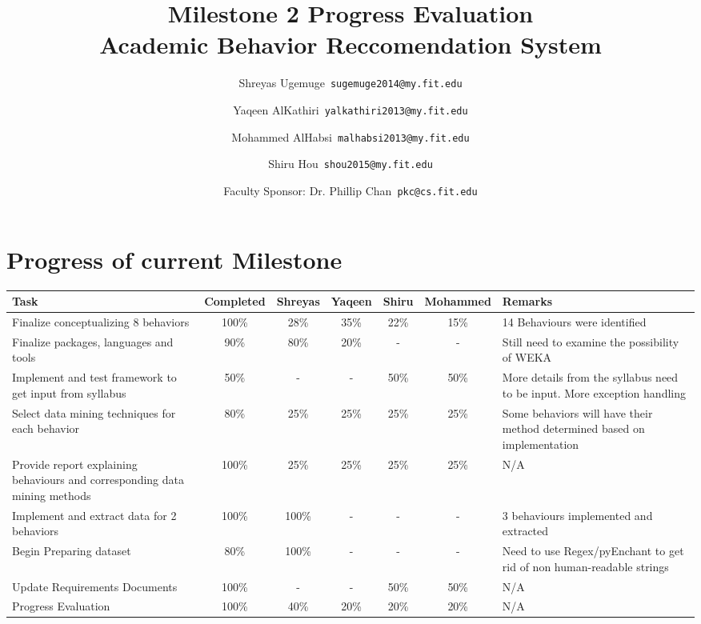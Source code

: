 \documentclass[12pt]{article}
\begin{document}
	\title{\textbf{Milestone 2 Progress Evaluation} \\ \hfill \break
	Academic Behavior Reccomendation System}
	\author{Shreyas Ugemuge\      \texttt{sugemuge2014@my.fit.edu}
  \and
  Yaqeen AlKathiri\      \texttt{yalkathiri2013@my.fit.edu}
  \and
	Mohammed AlHabsi\      \texttt{malhabsi2013@my.fit.edu}
  \and
  Shiru Hou\      \texttt{shou2015@my.fit.edu}
  \and
  Faculty Sponsor: Dr. Phillip Chan\      \texttt{pkc@cs.fit.edu}}
	\maketitle
	\pagebreak
	\singlespacing
	\tableofcontents
	\pagebreak
	\section{Progress of current Milestone}
	\begin{adjustbox}{totalheight=\baselineskip}
	\begin{tabularx}{\textwidth}{|X|c|c|c|c|c|X|}
	\hline
		\textbf{Task} & \textbf{Completed} &\textbf{Shreyas} & \textbf{Yaqeen} & \textbf{Shiru} & \textbf{Mohammed} & \textbf{Remarks}  \\
		\hline
		Finalize conceptualizing 8 behaviors & 100\% & 28\% & 35\% & 22\% & 15\% & 14 Behaviours were identified \\ \hline
		Finalize packages, languages and tools & 90\% & 80\% & 20\% & - & - & Still need to examine the possibility of WEKA \\ \hline
		Implement and test framework to get input from syllabus & 50\% & - & - & 50\% & 50\% & More details from the syllabus need to be input. More exception handling\\ \hline
		Select data mining techniques for each behavior & 80\% & 25\% & 25\% & 25\% & 25\% & Some behaviors will have their method determined based on implementation\\ \hline
		Provide report explaining behaviours and corresponding data mining methods & 100\% &25\% & 25\% & 25\% & 25\% & N/A\\ \hline
		Implement and extract data for 2 behaviors & 100\% &100\% & - & - & - & 3 behaviours implemented and extracted\\ \hline
		Begin Preparing dataset & 80\% & 100\% & -  & - & - & Need to use Regex/pyEnchant to get rid of non human-readable strings \\  \hline
		Update Requirements Documents & 100\% & - & - & 50\% & 50\% & N/A \\ \hline
		Progress Evaluation & 100\% & 40\% & 20\% & 20\% & 20\% & N/A \\ \hline 
	\end{tabularx}
	\end{adjustbox}
\end{document}
